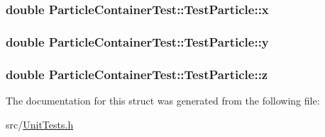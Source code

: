 \hypertarget{structParticleContainerTest_1_1TestParticle_add0472ca8a31ba4630b5470fc710fd37}{
\subsubsection[{x}]{\setlength{\rightskip}{0pt plus 5cm}double Particle\-Container\-Test\-::\-Test\-Particle\-::x}}\label{structParticleContainerTest_1_1TestParticle_add0472ca8a31ba4630b5470fc710fd37}
\hypertarget{structParticleContainerTest_1_1TestParticle_af27fbca6e49c80bd1b8555df0e7b1380}{
\subsubsection[{y}]{\setlength{\rightskip}{0pt plus 5cm}double Particle\-Container\-Test\-::\-Test\-Particle\-::y}}\label{structParticleContainerTest_1_1TestParticle_af27fbca6e49c80bd1b8555df0e7b1380}
\hypertarget{structParticleContainerTest_1_1TestParticle_a0d9bef972bdcf0fc2465aa2a4d124033}{
\subsubsection[{z}]{\setlength{\rightskip}{0pt plus 5cm}double Particle\-Container\-Test\-::\-Test\-Particle\-::z}}\label{structParticleContainerTest_1_1TestParticle_a0d9bef972bdcf0fc2465aa2a4d124033}


The documentation for this struct was generated from the following file\-:\begin{DoxyCompactItemize}
\item 
src/\hyperlink{UnitTests_8h}{Unit\-Tests.\-h}\end{DoxyCompactItemize}

